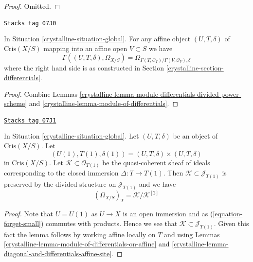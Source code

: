 \begin{proof}
Omitted.
\end{proof}

\begin{lemma}
\label{crystalline-lemma-module-of-differentials-on-affine}
\href{https://stacks.math.columbia.edu/tag/07J0}{\texttt{Stacks tag 07J0}}

In Situation \ref{crystalline-situation-global}.
For any affine object $(U, T, \delta)$ of $\text{Cris}(X/S)$
mapping into an affine open $V \subset S$ we have
$$
\Gamma((U, T, \delta), \Omega_{X/S}) =
\Omega_{\Gamma(T, \mathcal{O}_T)/\Gamma(V, \mathcal{O}_V), \delta}
$$
where the right hand side is
as constructed in Section \ref{crystalline-section-differentials}.
\end{lemma}

\begin{proof}

Combine Lemmas \ref{crystalline-lemma-module-differentials-divided-power-scheme} and
\ref{crystalline-lemma-module-of-differentials}.
\end{proof}

\begin{lemma}
\label{crystalline-lemma-describe-omega-small}
\href{https://stacks.math.columbia.edu/tag/07J1}{\texttt{Stacks tag 07J1}}

In Situation \ref{crystalline-situation-global}.
Let $(U, T, \delta)$ be an object of $\text{Cris}(X/S)$.
Let
$$
(U(1), T(1), \delta(1)) = (U, T, \delta) \times (U, T, \delta)
$$
in $\text{Cris}(X/S)$. Let $\mathcal{K} \subset \mathcal{O}_{T(1)}$
be the quasi-coherent sheaf of ideals corresponding to the closed
immersion $\Delta : T \to T(1)$. Then
$\mathcal{K} \subset \mathcal{J}_{T(1)}$ is preserved by the
divided structure on $\mathcal{J}_{T(1)}$ and we have
$$
(\Omega_{X/S})_T = \mathcal{K}/\mathcal{K}^{[2]}
$$
\end{lemma}

\begin{proof}

Note that $U = U(1)$ as $U \to X$ is an open immersion and as
(\ref{equation-forget-small}) commutes with products. Hence we see that
$\mathcal{K} \subset \mathcal{J}_{T(1)}$. Given this fact the lemma follows
by working affine locally on $T$ and using
Lemmas \ref{crystalline-lemma-module-of-differentials-on-affine} and
\ref{crystalline-lemma-diagonal-and-differentials-affine-site}.
\end{proof}

